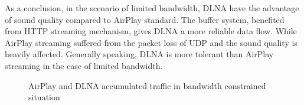 As a conclusion, in the scenario of limited bandwidth, DLNA have the advantage
of sound quality compared to AirPlay standard. The buffer system, benefited from HTTP streaming mechanism, gives DLNA a more reliable data flow. While AirPlay streaming suffered from the packet loss of UDP and the sound quality is heavily affected. Generally speaking, DLNA is more tolerant than AirPlay streaming in the case of limited bandwidth. \begin{figure}[hb]%
\caption{AirPlay and DLNA accumulated traffic in
bandwidth constrained situation\label{all_traffic_bw}}
\end{figure}
